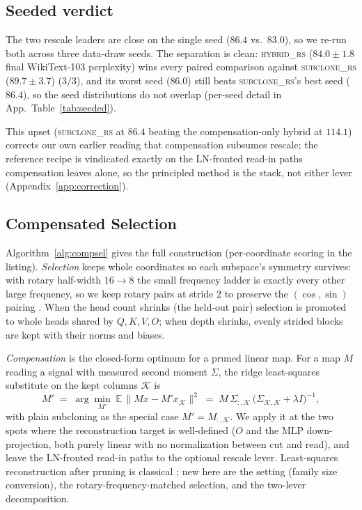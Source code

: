 \subsection{Seeded verdict}
\label{sec:race:seeded}

The two rescale leaders are close on the single seed ($86.4$ vs.\ $83.0$), so we
re-run both across three data-draw seeds. The separation is clean:
\textsc{hybrid\_rs} ($84.0\pm1.8$ final WikiText-103 perplexity) wins every paired
comparison against \textsc{subclone\_rs} ($89.7\pm3.7$) ($3/3$), and its
worst seed ($86.0$) still beats \textsc{subclone\_rs}'s best seed
($86.4$), so the seed distributions do not overlap (per-seed detail in
App.~Table~\ref{tab:seeded}).

This upset (\textsc{subclone\_rs} at $86.4$ beating the compensation-only hybrid
at $114.1$) corrects our own earlier reading that compensation subsumes rescale;
the reference recipe is vindicated exactly on the LN-fronted read-in paths
compensation leaves alone, so the principled method is the stack, not either
lever (Appendix~\ref{app:correction}).

\subsection{Compensated Selection}
\label{sec:race:alg}

Algorithm~\ref{alg:compsel} gives the full construction (per-coordinate scoring
in the listing). \emph{Selection} keeps whole coordinates so each subspace's
symmetry survives: with rotary half-width $16\to8$ the small frequency ladder is
exactly every other large frequency, so we keep rotary pairs at stride $2$ to
preserve the $(\cos,\sin)$ pairing \citep{su2024roformer}. When the head
count shrinks (the held-out pair) selection is promoted to whole heads
shared by $Q,K,V,O$; when depth shrinks, evenly strided blocks are kept with
their norms and biases.

\emph{Compensation} is the closed-form optimum for a pruned linear map. For a map
$M$ reading a signal with measured second moment $\Sigma$, the ridge
least-squares substitute on the kept columns $\mathcal{K}$ is
\begin{equation}
\label{eq:lscomp}
M' \;=\; \arg\min_{M'} \; \mathbb{E}\,\big\lVert Mx - M'x_{\mathcal{K}}\big\rVert^2
\;=\; M\,\Sigma_{:,\mathcal{K}}\,\big(\Sigma_{\mathcal{K},\mathcal{K}} + \lambda I\big)^{-1},
\end{equation}
with plain subcloning as the special case $M'=M_{:,\mathcal{K}}$. We apply it at
the two spots where the reconstruction target is well-defined ($O$ and the MLP
down-projection, both purely linear with no normalization between cut and read),
and leave the LN-fronted read-in paths to the optional rescale lever.
Least-squares reconstruction after pruning is classical
\citep{hassibi1993optimal,ma2023llmpruner}; new here are the setting (family
size conversion), the rotary-frequency-matched selection, and the two-lever
decomposition.


